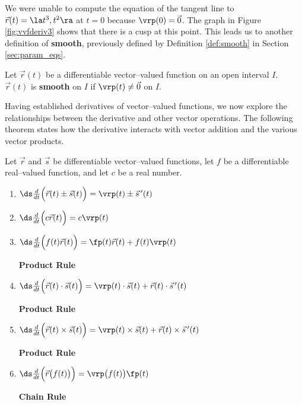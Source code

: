 We were unable to compute the equation of the tangent line to $\vec r(t)= \la t^3,t^2\ra$ at $t=0$ because $\vrp(0) = \vec 0$. The graph in Figure \ref{fig:vvfderiv3} shows that there is a cusp at this point. This leads us to another definition of \textbf{smooth}, previously defined by Definition \ref{def:smooth} in Section \ref{sec:param_eqs}.

{Let $\vec r(t)$ be a differentiable vector--valued function on an open interval $I$. $\vec r(t)$ is \textbf{smooth} on $I$ if $\vrp(t)\neq \vec 0$ on $I$.
}

Having established derivatives of vector--valued functions, we now explore the relationships between the derivative and other vector operations. The following theorem states how the derivative interacts with vector addition and the various vector products.\\

{Let $\vec r$ and $\vec s$ be differentiable vector--valued functions, let $f$ be a differentiable real--valued function, and let $c$ be a real number.
\begin{enumerate}
	\item $\ds \frac{d}{dt}\Big(\vec r(t) \pm \vec s(t)\Big) = \vrp(t) \pm \vec s\,'(t)$
	\item $\ds \frac{d}{dt}\Big(c\vec r(t)\Big) = c\vrp(t)$
	\item \parbox{200pt}{$\ds \frac{d}{dt}\Big(f(t)\vec r(t)\Big) = \fp(t)\vec r(t) + f(t)\vrp(t)$} \textbf{Product Rule}
	\item \parbox{200pt}{$\ds \frac{d}{dt}\Big(\vec r(t)\cdot \vec s(t) \Big) = \vrp(t)\cdot \vec s(t) + \vec r(t)\cdot \vec s\,'(t)$} \textbf{Product Rule}
	\item \parbox{200pt}{$\ds \frac{d}{dt}\Big(\vec r(t)\times \vec s(t) \Big) = \vrp(t)\times \vec s(t) + \vec r(t)\times \vec s\,'(t)$} \textbf{Product Rule}
	\item \parbox{200pt}{$\ds \frac{d}{dt}\Big(\vec r\big(f(t)\big)\Big) = \vrp\big(f(t)\big)\fp(t)$}  \textbf{Chain Rule}
	\end{enumerate}
}\\

